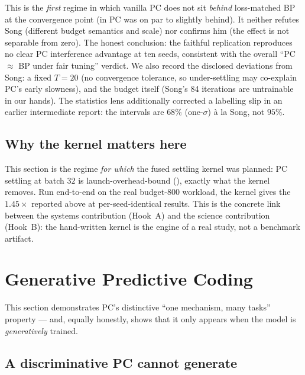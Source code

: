 This is the \emph{first} regime in which vanilla PC does not sit \emph{behind} loss-matched BP at
the convergence point (in  PC was on par to slightly behind). It neither refutes
Song (different budget semantics and scale) nor confirms him (the effect is not separable from
zero). The honest conclusion: the faithful replication reproduces no clear PC interference
advantage at ten seeds, consistent with the overall ``PC \(\approx\) BP under fair tuning''
verdict. We also record the disclosed deviations from Song: a fixed \(T=20\) (no convergence
tolerance, so under-settling may co-explain PC's early slowness), and the budget itself (Song's 84
iterations are untrainable in our hands). The statistics lens additionally corrected a labelling
slip in an earlier intermediate report: the intervals are \(68\%\) (one-\(\sigma\)) à la Song, not
\(95\%\).

\subsection{Why the kernel matters here}

This section is the regime \emph{for which} the fused settling kernel was planned: PC settling at
batch \(32\) is launch-overhead-bound (), exactly what the kernel removes. Run
end-to-end on the real budget-800 workload, the kernel gives the \(1.45\times\) reported above at
per-seed-identical results. This is the concrete link between the systems contribution (Hook~A) and
the science contribution (Hook~B): the hand-written kernel is the engine of a real study, not a
benchmark artifact.

\section{Generative Predictive Coding}\label{sec:exp-gen}

This section demonstrates PC's distinctive ``one mechanism, many tasks'' property --- and, equally
honestly, shows that it only appears when the model is \emph{generatively} trained.

\subsection{A discriminative PC cannot generate}

